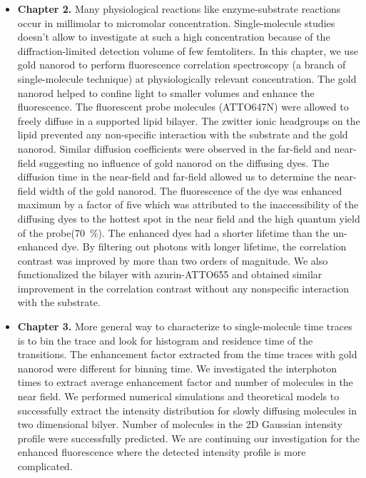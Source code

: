 \begin{itemize}
	\item \textbf{Chapter 2.} Many physiological reactions like enzyme-substrate reactions occur in millimolar to micromolar concentration. Single-molecule studies doesn't allow to investigate at such a high concentration because of the diffraction-limited detection volume of few femtoliters. In this chapter, we use gold nanorod to perform fluorescence correlation spectroscopy (a branch of single-molecule technique) at physiologically relevant concentration. The gold nanorod helped to confine light to smaller volumes and enhance the fluorescence. The fluorescent probe molecules (ATTO647N) were allowed to freely diffuse in a supported lipid bilayer. The zwitter ionic headgroups on the lipid prevented any non-specific interaction with the substrate and the gold nanorod. Similar diffusion coefficients were observed in the far-field and near-field suggesting no influence of gold nanorod on the diffusing dyes. The diffusion time in the near-field and far-field allowed us to determine the near-field width of the gold nanorod. The fluorescence of the dye was enhanced maximum by a factor of five which was attributed to the inaccessibility of the diffusing dyes to the hottest spot in the near field and the high quantum yield of the probe(\SI{70}{\percent}).
	The enhanced dyes had a shorter lifetime than the un-enhanced dye. By filtering out photons with longer lifetime, the correlation contrast was improved by more than two orders of magnitude. We also functionalized the bilayer with azurin-ATTO655 and obtained similar improvement in the correlation contrast without any nonspecific interaction with the substrate.

	\item \textbf{Chapter 3.} More general way to characterize to single-molecule time traces is to bin the trace and look for histogram and residence time of the transitions. The enhancement factor extracted from the time traces with gold nanorod were different for binning time. We investigated the interphoton times to extract average enhancement factor and number of molecules in the near field. We performed numerical simulations and theoretical models to successfully extract the intensity distribution for slowly diffusing molecules in two dimensional bilyer. Number of molecules in the 2D Gaussian intensity profile were successfully predicted. We are continuing our investigation for the enhanced fluorescence where the detected intensity profile is more complicated.
	

\end{itemize}
